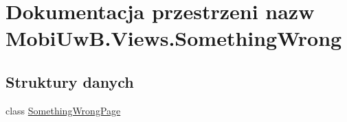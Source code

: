 \hypertarget{a00293}{}\section{Dokumentacja przestrzeni nazw Mobi\+Uw\+B.\+Views.\+Something\+Wrong}
\label{a00293}
\subsection*{Struktury danych}
\begin{DoxyCompactItemize}
\item 
class \hyperlink{a00058}{Something\+Wrong\+Page}
\end{DoxyCompactItemize}
